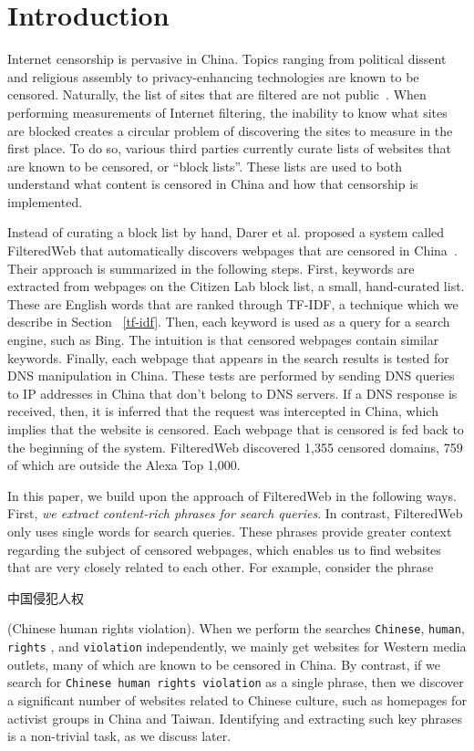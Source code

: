 
\section{Introduction} 

Internet censorship is pervasive in China. Topics ranging from political
dissent and religious assembly to privacy-enhancing technologies are known to
be censored. Naturally, the list of sites that are filtered are not
public~\cite{fhouse:china}. When performing measurements of Internet
filtering, the inability to know what sites are blocked creates a circular
problem of discovering the sites to measure in the first place. To do so, various
third parties currently curate
lists of websites that are known to be censored, or ``block lists''. These
lists are used to both understand {what} content is censored in China and
how that censorship is implemented.

Instead of curating a block list by hand, Darer et al. proposed a
system called FilteredWeb that automatically discovers webpages that
are censored in China~\cite{darer2017filteredweb}. Their approach is
summarized in the following steps. First, keywords are extracted from
webpages on the Citizen Lab block list, a small, hand-curated
list. These are English words that are ranked through TF-IDF, a
technique which we describe in Section ~\ref{tf-idf}. Then, each
keyword is used as a query for a search engine, such as Bing. The
intuition is that censored webpages contain similar keywords. Finally,
each webpage that appears in the search results is tested for DNS
manipulation in China. These tests are performed by sending DNS
queries to IP addresses in China that don't belong to DNS servers. If
a DNS response is received, then, it is inferred that the request was
intercepted in China, which implies that the website is censored. Each
webpage that is censored is fed back to the beginning of the
system. FilteredWeb discovered 1,355 censored domains, 759 of which
are outside the Alexa Top 1,000.

In this paper, we build upon the approach of FilteredWeb in the
following ways. First, {\em we extract content-rich phrases
for search queries}. In contrast, FilteredWeb only uses single words
for search queries. These phrases provide greater context regarding
the subject of censored webpages, which enables us to find websites
that are very closely related to each other. For example, consider the
phrase \begin{CJK*}{UTF8}{gbsn}中国侵犯人权 \end{CJK*} (Chinese human
rights violation). When we perform the searches \texttt{Chinese},
\texttt{human}, \texttt{rights} , and \texttt{violation}
independently, we mainly get websites for Western media outlets, many
of which are known to be censored in China. By contrast, if we search
for \texttt{Chinese human rights violation} as a single phrase, then
we discover a significant number of websites related to Chinese
culture, such as homepages for activist groups in China and
Taiwan. Identifying and extracting such key phrases is a non-trivial
task, as we discuss later.

